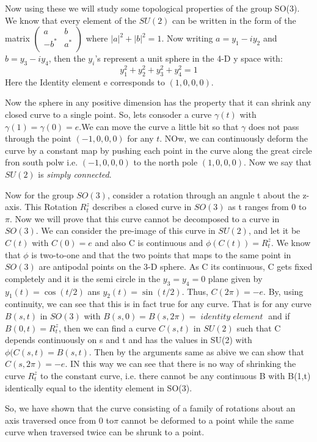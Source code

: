 Now using these we will study some topological properties of the group SO(3). We know that every element of the $SU(2)$ can be written in the form of the matrix 
$\begin{pmatrix}
a&b\\
-b^{*}&a^{*}\\
\end{pmatrix}$
where $|a|^{2}+|b|^{2}=1$. Now writing $a=y_1-iy_2$ and $b=y_3-iy_4$, then the $y_i$'s represent a unit sphere in the 4-D y space with:
\begin{equation}
    y_{1}^{2}+y_{2}^{2}+y_{3}^{2}+y_{4}^{2}=1
\end{equation}
Here the Identity element e corresponds to $(1,0,0,0)$.

Now the sphere in any positive dimension has the property that it can shrink any closed curve to a single point. So, lets consoder a curve $\gamma(t)$ with $ \gamma (1) =\gamma (0) = e $.We can move the curve a little bit so that $\gamma$ does not pass through the point $(-1,0,0,0)$ for any $t$. NOw, we can continuously deform the curve by a constant map by pushing each point in the curve along the great circle fron south polw i.e. $(-1,0,0,0)$ to the north pole $(1,0,0,0)$. Now we say that $SU(2)$ is \textit{simply connected}. 

Now for the group $SO(3)$, consider a rotation through an angnle t about the z-axis. This Rotation $R_{t}^{z}$ describes a closed curve in $SO(3)$ as t ranges from $0$ to $\pi$. Now we will prove that this curve cannot be decomposed to a curve in $SO(3)$. We can consider the pre-image of this curve in $SU(2)$, and let it be $C(t)$ with $C(0)=e$ and also C is continuous and $\phi(C(t))=R_{t}^{z}$. We know that $\phi$ is two-to-one and that the two points that maps to the same point in $SO(3)$ are antipodal points on the 3-D sphere. As C its continuous, C gets fixed completely and it is the semi circle in the $y_3=y_4=0$ plane given by $y_1(t)=\cos(t/2)$ ans $y_2(t)=\sin(t/2)$. Thus, $C(2\pi)=-e$. By, using continuity, we can see that this is in fact true for any curve. That is for any curve $B(s,t)$ in $SO(3)$ with $B(s,0)=B(s,2\pi)=\;identity\;element\;$ and if $B(0,t)=R_{t}^{z}$, then we can find a curve $C(s,t)$ in $SU(2)$ such that C depends continuously on s and t and has the values in SU(2) with $\phi(C(s,t)=B(s,t)$. Then by the arguments same as abive we can show that $C(s,2\pi)=-e$. IN this way we can see that there is no way of shrinking the curve $R_{t}^{z}$ to the constant curve, i.e. there cannot be any continuous B with B(1,t) identically equal to the identity element in SO(3).

So, we have shown that the curve consisting of a family of rotations about an axis traversed once from 0 to$\pi$ cannot be deformed to a point while the same curve when traversed twice can be shrunk to a point.